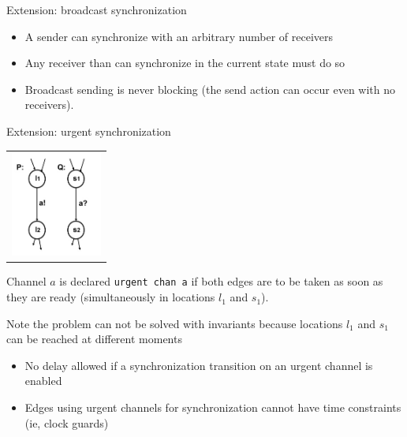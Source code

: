 \documentclass{beamer}
\def\dgold#1{{\darkgoldenrod #1}}
\def\dkb#1{{\blue #1}}
\begin{document}
\begin{slide}{Extension: broadcast synchronization}
\small



\begin{itemize}
\item A sender  can synchronize with an arbitrary number of receivers 
\item Any receiver than can synchronize in the current state must do so
\item Broadcast sending is never blocking (the send action can occur even with no receivers).
\end{itemize}

\end{slide}

\begin{slide}{Extension: urgent synchronization}
\small

\begin{tabular}{c}
   \includegraphics[width=3cm]{./images/urgent.jpg} 
\end{tabular}

Channel $a$ is declared \dkb{\texttt{urgent chan a}} if both edges are to be taken as soon as they are ready 
(\dgold{simultaneously} in locations $l_1$ and $s_1$).

Note the problem can  \dgold{not} be solved with \dgold{invariants} because locations $l_1$ and $s_1$ 
can be reached at different moments

\begin{itemize}
\item No delay allowed if a synchronization transition on an urgent channel is enabled
\item Edges using urgent channels for synchronization cannot have time constraints (ie, clock guards)
\end{itemize}

\end{slide}
\end{document}
